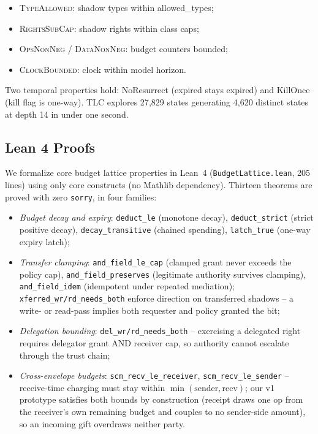 \documentclass[letterpaper,twocolumn,10pt]{article}
\begin{document}
\begin{itemize}
\item \textsc{TypeAllowed}: shadow types within allowed\_types;
\item \textsc{RightsSubCap}: shadow rights within class caps;
\item \textsc{OpsNonNeg} / \textsc{DataNonNeg}: budget counters bounded;
\item \textsc{ClockBounded}: clock within model horizon.
\end{itemize}

Two temporal properties hold: NoResurrect (expired stays expired) and
KillOnce (kill flag is one-way).  TLC explores 27{,}829 states
generating 4{,}620 distinct states at depth 14 in under one second.

\subsection{Lean 4 Proofs}

We formalize core budget lattice properties in Lean~4
(\texttt{BudgetLattice.lean}, 205 lines) using only core constructs
(no Mathlib dependency).  Thirteen theorems are proved with zero
\texttt{sorry}, in four families:

\begin{itemize}
\item \emph{Budget decay and expiry}: \texttt{deduct\_le}
      (monotone decay), \texttt{deduct\_strict} (strict positive
      decay), \texttt{decay\_transitive} (chained spending),
      \texttt{latch\_true} (one-way expiry latch);
\item \emph{Transfer clamping}:
      \texttt{and\_field\_le\_cap} (clamped grant never exceeds the
      policy cap), \texttt{and\_field\_preserves} (legitimate
      authority survives clamping), \texttt{and\_field\_idem}
      (idempotent under repeated mediation);
      \texttt{xferred\_wr/rd\_needs\_both} enforce direction on
      transferred shadows -- a write- or read-pass implies both
      requester and policy granted the bit;
\item \emph{Delegation bounding}:
      \texttt{del\_wr/rd\_needs\_both} -- exercising a delegated
      right requires delegator grant AND receiver cap, so authority
      cannot escalate through the trust chain;
\item \emph{Cross-envelope budgets}:
      \texttt{scm\_recv\_le\_receiver},
      \texttt{scm\_recv\_le\_sender} -- receive-time charging must
      stay within $\min(\mathrm{sender},\mathrm{recv})$; our v1
      prototype satisfies both bounds by construction (receipt draws
      one op from the receiver's own remaining budget and couples to
      no sender-side amount), so an incoming gift overdraws neither
      party.
\end{itemize}
\end{document}
